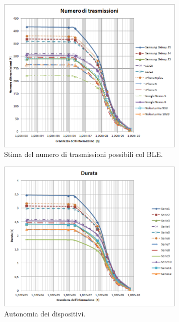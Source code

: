 \begin{figure}[t]
	\centering
	\includegraphics[width=0.8\textwidth, keepaspectratio]{Images/studio_energetico/numero_trasmissioni}
	\caption[Stima del numero di trasmissioni possibili]{Stima del numero di trasmissioni possibili col \acs{BLE}.}
	\label{fig:numero_trasmissioni}
\end{figure}
\begin{figure}[t]
	\centering
	\includegraphics[width=0.8\textwidth, keepaspectratio]{Images/studio_energetico/durata}
	\caption[Autonomia dei dispositivi]{Autonomia dei dispositivi.}
	\label{fig:durata}
\end{figure}